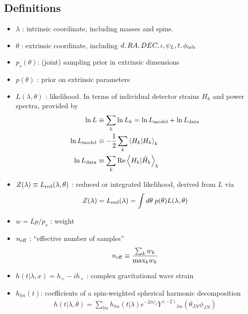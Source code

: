 \documentclass[twocolumn,prd,nofootinbib]{revtex4}
\newcommand\Y[1]{Y^{(#1)}{}}
\newcommand\qmstateproduct[2]{\left\langle#1|#2\right\rangle}
\begin{document}
\subsection{Definitions}
\begin{itemize}
\item $\lambda$ : intrinsic coordinate, including masses and spins.

\item $\theta$ : extrinsic coordinate, including $d,RA,DEC,\iota,\psi_L,t,\phi_{\rm orb}$

\item $p_s(\theta)$: (joint) sampling prior in extrinsic dimensions

\item $p(\theta)$ : prior on extrinsic parameters

\item $L(\lambda,\theta)$ : likelihood.  In terms of individual detector strains $H_k$ and power spectra, provided by
\begin{eqnarray}
\ln L &\equiv \sum_k \ln L_k  = \ln L_{\rm model} + \ln L_{\rm data} \\
\ln L_{\rm model} &\equiv -\frac{1}{2} \sum_k \qmstateproduct{H_k}{H_k}_k  \\
\ln L_{\rm data} &\equiv  \sum_k \text{Re} \qmstateproduct{H_k}{\hat{H}_k}_k 
\end{eqnarray}

\item $Z(\lambda) \equiv L_{\rm red}(\lambda,\theta)$ : reduced or integrated likelihood, derived from $L$ via
\begin{eqnarray}
Z(\lambda) = L_{\rm red}(\lambda) = \int d\theta \; p(\theta) L(\lambda,\theta)
\end{eqnarray}

\item 
$w=Lp/p_s$ : weight

\item 
$n_{\rm eff}$ : ``effective number of samples''
\begin{eqnarray}
n_{\rm eff} \equiv  \frac{\sum_k w_k}{\text{max}_k w_k}
\end{eqnarray}

\item 
$h(t|\lambda,x)=h_+-i h_\times$ : complex gravitational wave strain

\item 
$h_{lm}(t)$: coefficients of a spin-weighted spherical harmonic decomposition
\begin{eqnarray}
\label{eq:def:hSpinWeightEmissionDirection}
h(t|\lambda,\theta) = \sum_{lm} h_{lm}(t|\lambda) e^{-2i\psi_J}\Y{-2}_{lm}(\theta_{JN}\phi_{JN})
\end{eqnarray}


\end{itemize}
\end{document}
